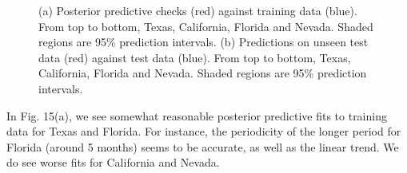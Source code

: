 \documentclass{article}
\begin{document}
\begin{figure}[H]
    \centering
    \quad
    \caption{(a) Posterior predictive checks (red) against training data (blue). From top to bottom, Texas, California, Florida and Nevada. Shaded regions are 95\% prediction intervals. (b) Predictions on unseen test data (red) against test data (blue). From top to bottom, Texas, California, Florida and Nevada. Shaded regions are 95\% prediction intervals. }
\end{figure}

\noindent In Fig. 15(a), we see somewhat reasonable posterior predictive fits to training data for Texas and Florida. For instance, the periodicity of the longer period for Florida (around 5 months) seems to be accurate, as well as the linear trend. We do see worse fits for California and Nevada. 
\end{document}
